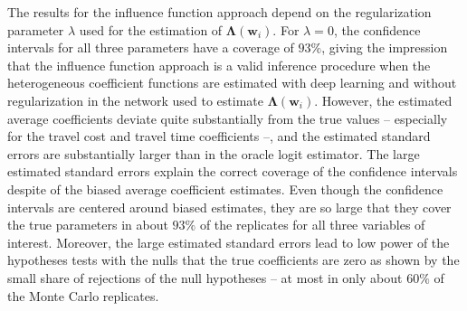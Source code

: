 \documentclass[a4paper, 12pt]{article}
\begin{document}
The results for the influence function approach depend on the regularization parameter $\lambda$ used for the estimation of $\bm{\Lambda}(\bm{w}_i)$. For $\lambda=0$, the confidence intervals for all three parameters have a coverage of $93\%$, giving the impression that the influence function approach is a valid inference procedure when the heterogeneous coefficient functions are estimated with deep learning and without regularization in the network used to estimate $\bm{\Lambda}(\bm{w}_i)$.  
However, the estimated average coefficients deviate quite substantially from the true values -- especially for the travel cost and travel time coefficients --, and the estimated standard errors are substantially larger than in the oracle logit estimator. The large estimated standard errors explain the correct coverage of the confidence intervals despite of the biased average coefficient estimates. Even though the confidence intervals are centered around biased estimates, they are so large that they cover the true parameters in about $93\%$ of the replicates for all three variables of interest. Moreover, the large estimated standard errors lead to  low power of the hypotheses tests with the nulls that the true coefficients are zero as shown by the small share of rejections of the null hypotheses -- at most in only about $60\%$ of the Monte Carlo replicates.
\end{document}
